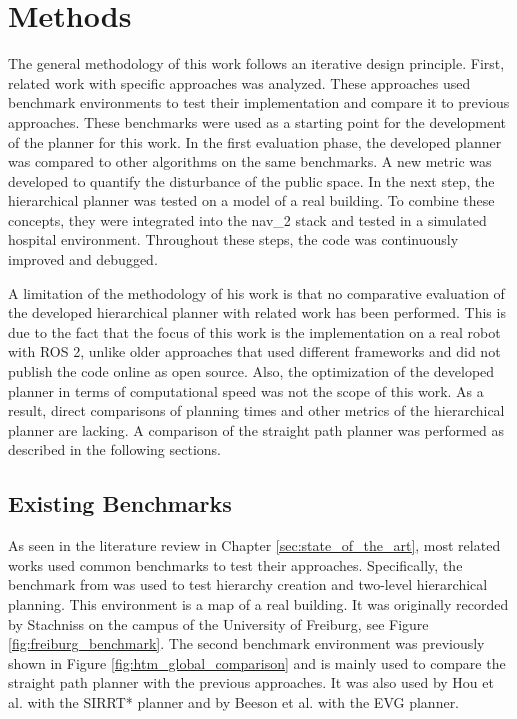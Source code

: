 \chapter{Methods}
\label{sec:methods}
The general methodology of this work follows an iterative design principle. First, related work with specific approaches was analyzed. These approaches used benchmark environments to test their implementation and compare it to previous approaches. These benchmarks were used as a starting point for the development of the planner for this work. In the first evaluation phase, the developed planner was compared to other algorithms on the same benchmarks. A new metric was developed to quantify the disturbance of the public space. In the next step, the hierarchical planner was tested on a model of a real building. To combine these concepts, they were integrated into the \gls{nav_2} stack and tested in a simulated hospital environment. Throughout these steps, the code was continuously improved and debugged.

A limitation of the methodology of his work is that no comparative evaluation of the developed hierarchical planner with related work has been performed. This is due to the fact that the focus of this work is the implementation on a real robot with ROS 2, unlike older approaches that used different frameworks and did not publish the code online as open source. Also, the optimization of the developed planner in terms of computational speed was not the scope of this work. As a result, direct comparisons of planning times and other metrics of the hierarchical planner are lacking. A comparison of the straight path planner was performed as described in the following sections.

\section{Existing Benchmarks}
\label{sec:benchmarks}
 As seen in the literature review in Chapter \ref{sec:state_of_the_art}, most related works used common benchmarks to test their approaches. Specifically, the benchmark from \cite{ryu_hierarchical_2020} was used to test hierarchy creation and two-level hierarchical planning. This environment is a map of a real building. It was originally recorded by Stachniss \cite{cyrill_stachniss_robotics_2015} on the campus of the University of Freiburg, see Figure \ref{fig:freiburg_benchmark}. The second benchmark environment was previously shown in Figure \ref{fig:htm_global_comparison} and is mainly used to compare the straight path planner with the previous approaches. It was also used by Hou et al. \cite{hou_straight_2021} with the SIRRT* planner and by Beeson et al. \cite{beeson_towards_2005} with the EVG planner.

